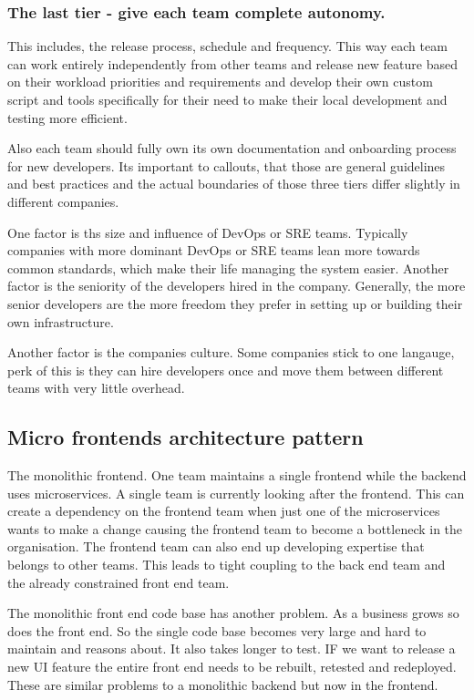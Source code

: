 \subsubsection{The last tier - give each team complete autonomy.}
This includes, the release process, schedule and frequency.
This way each team can work entirely independently from other teams and release new feature based on their workload priorities and requirements and develop their own custom script and tools specifically for their need to make their local development and testing more efficient.

Also each team should fully own its own documentation and onboarding process for new developers.
Its important to callouts, that those are general guidelines and best practices and the actual boundaries of those three tiers differ slightly in different companies.

One factor is ths size and influence of DevOps or SRE teams.
Typically companies with more dominant DevOps or SRE teams lean more towards common standards, which make their life managing the system easier.
Another factor is the seniority of the developers hired in the company.
Generally, the more senior developers are the more freedom they prefer in setting up or building their own infrastructure.

Another factor is the companies culture.
Some companies stick to one langauge, perk of this is they can hire developers once and move them between different teams with very little overhead.

\subsection{Micro frontends architecture pattern}
The monolithic frontend.
One team maintains a single frontend while the backend uses microservices.
A single team is currently looking after the frontend.
This can create a dependency on the frontend team when just one of the microservices wants to make a change causing the frontend team to become a bottleneck in the organisation.
The frontend team can also end up developing expertise that belongs to other teams.
This leads to tight coupling to the back end team and the already constrained front end team.

The monolithic front end code base has another problem.
As a business grows so does the front end.
So the single code base becomes very large and hard to maintain and reasons about.
It also takes longer to test.
IF we want to release a new UI feature the entire front end needs to be rebuilt, retested and redeployed.
These are similar problems to a monolithic backend but now in the frontend.

